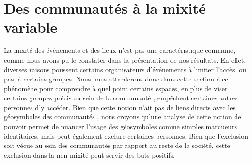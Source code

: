 \section{Des communautés à la mixité variable}
\label{sec:des_communautes_a_la_mixite_variable}

La mixité des événements et des lieux \lgbt{} n'est pas une caractéristique commune, comme nous avons pu le constater dans la présentation de nos résultats.
En effet, diverses raisons poussent certains organisateurs d'événements à limiter l'accès, ou pas, à certains groupes.
Nous nous attarderons donc dans cette section à ce phénomène pour comprendre à quel point certains espaces, en plus de viser certains groupes précis au sein de la communauté \lgbt{}, empêchent certaines autres personnes d'y accéder.
Bien que cette notion n'ait pas de liens directs avec les géosymboles des communautés \lgbt{}, nous croyons qu'une analyse de cette notion de pouvoir permet de nuancer l'usage des géosymboles comme simples marqueurs identitaires, mais peut également exclure certaines personnes.
Bien que l'exclusion soit vécue au sein des communautés \lgbt{} par rapport au reste de la société, cette exclusion dans la non-mixité peut servir des buts positifs.

